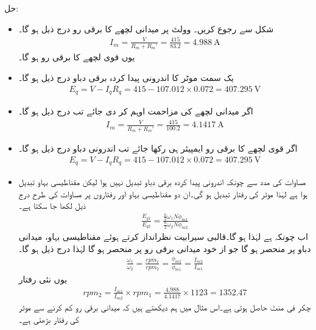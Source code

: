 حل:
\begin{itemize}
\item
شکل   سے رجوع کریں۔ وولٹ پر میدانی لچھے کا برقی رو درج ذیل ہو گا۔
\begin{align*}
I_m=\tfrac{V}{R_m+R_m'}=\frac{415}{83.2}=\SI{4.988}{\ampere}
\end{align*}
یوں قوی لچھے کا برقی رو  ہو گا۔
\item
یک سمت  موٹر کا اندرونی پیدا کردہ برقی دباو درج ذیل ہو گا۔
\begin{align*}
E_q=V-I_q R_q=415-107.012\times 0.072=\SI{407.295}{\volt}
\end{align*}
\item
اگر میدانی لچھے کی مزاحمت  اوہم کر دی جائے  تب  درج ذیل ہو گا۔
\begin{align*}
I_m=\frac{V}{R_m+R_m'}=\frac{415}{100.2}=\SI{4.1417}{\ampere}
\end{align*}
\item
اگر قوی لچھے کا برقی رو  ایمپیئر ہی رکھا جائے تب  اندرونی دباو درج ذیل ہو گا۔
\begin{align*}
E_q=V-I_q R_q=415-107.012 \times 0.072=\SI{407.295}{\volt}
\end{align*}
\item
مساوات   کی مدد سے  چونکہ اندرونی پیدا کردہ برقی دباو تبدیل نہیں ہوا لیکن مقناطیسی بہاو تبدیل ہوا ہے لہٰذا موٹر کی رفتار تبدیل ہو گی۔ان دو مقناطیسی بہاو اور رفتاروں پر مساوات  کی طرح  درج ذیل لکھا جا سکتا ہے۔
\begin{align*}
\frac{E_{q1}}{E_{q2}}=\frac{\frac{n}{2} \omega_1 N \phi_{m1}}{\frac{n}{2} \omega_2 N \phi_{m2}}
\end{align*}
اب چونکہ  ہے  لہٰذا  ہو گا۔قالبی سیرابیت  نظرانداز کرتے ہوئے مقناطیسی بہاو، میدانی دباو پر منحصر ہو گا جو از خود میدانی برقی رو پر منحصر ہو گا  لہٰذا درج ذیل ہو گا۔
\begin{align*}
\frac{\omega_1}{\omega_2}=\frac{rpm_1}{rpm_2}=\frac{\phi_{m2}}{\phi_{m1}}=\frac{I_{m2}}{I_{m1}}
\end{align*}
یوں  نئی رفتار
\begin{align*}
rpm_2=\frac{I_{m1}}{I_{m2}} \times rpm_1=\frac{4.988}{4.1417} \times 1123=1352.47
\end{align*}
چکر فی منٹ حاصل ہوتی ہے۔اس مثال میں ہم دیکھتے ہیں کہ میدانی برقی رو کم کرنے سے موٹر کی رفتار بڑھتی ہے۔
\end{itemize}
